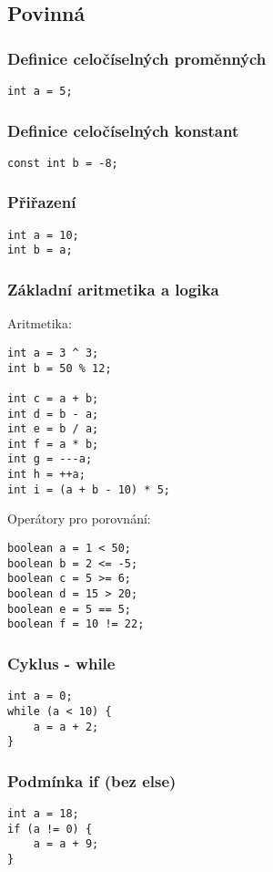 \documentclass[czech, oth, kiv, he, iso690numb, viewonly]{fasthesis}
\begin{document}
\subsection{Povinná}

\subsubsection{Definice celočíselných proměnných}
\begin{lstlisting}[]
int a = 5;
\end{lstlisting}


\subsubsection{Definice celočíselných konstant}
\begin{lstlisting}[]
const int b = -8;
\end{lstlisting}

\subsubsection{Přiřazení}
\begin{lstlisting}[]
int a = 10;
int b = a;
\end{lstlisting}

\subsubsection{Základní aritmetika a logika}
Aritmetika:
\begin{lstlisting}[]
int a = 3 ^ 3;
int b = 50 % 12;

int c = a + b;
int d = b - a;
int e = b / a;
int f = a * b;
int g = ---a; 
int h = ++a;   
int i = (a + b - 10) * 5; 
\end{lstlisting}
Operátory pro porovnání:
\begin{lstlisting}[]
boolean a = 1 < 50;
boolean b = 2 <= -5;
boolean c = 5 >= 6;
boolean d = 15 > 20;
boolean e = 5 == 5;
boolean f = 10 != 22;
\end{lstlisting}

\subsubsection{Cyklus - while}
\begin{lstlisting}[]
int a = 0;
while (a < 10) {
    a = a + 2;
}
\end{lstlisting}

\subsubsection{Podmínka if (bez else)}
\begin{lstlisting}[]
int a = 18;
if (a != 0) {
    a = a + 9;
}
\end{lstlisting}
\end{document}
